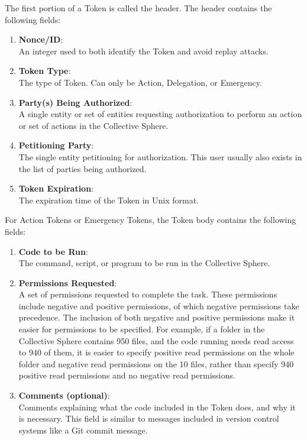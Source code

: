 The first portion of a Token is called the header. The header contains the
following fields:
\begin{enumerate}
\item \textbf{Nonce/ID}:\\ 
An integer used to both identify the Token and avoid replay attacks.
\item \textbf{Token Type}:\\ 
The type of Token. Can only be Action, Delegation, or Emergency.
\item \textbf{Party(s) Being Authorized}:\\
A single entity or set of entities requesting authorization to perform an action
or set of actions in the Collective Sphere.
\item \textbf{Petitioning Party}:\\
The single entity petitioning for authorization. This user usually also exists
in the list of parties being authorized.
\item \textbf{Token Expiration}:\\
The expiration time of the Token in Unix format.
\end{enumerate}

For Action Tokens or Emergency Tokens, the Token body contains the following
fields:
\begin{enumerate}
\item \textbf{Code to be Run}:\\
The command, script, or program to be run in the Collective Sphere.
\item \textbf{Permissions Requested}:\\
A set of permissions requested to complete the task. These permissions include
negative and positive permissions, of which negative permissions take
precedence. The inclusion of both negative and positive permissions make it
easier for permissions to be specified. For example, if a folder in the
Collective Sphere contains 950 files, and the code running needs read access to
940 of them, it is easier to specify positive read permissions on the whole
folder and negative read permissions on the 10 files, rather than specify 940
positive read permissions and no negative read permissions.
\item \textbf{Comments (optional)}:\\
Comments explaining what the code included in the Token does, and why it is
necessary. This field is similar to messages included in version control systems
like a Git commit message.
\end{enumerate}

